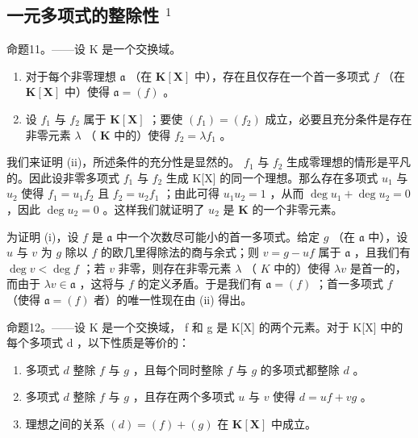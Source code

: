 \subsection{\texorpdfstring{一元多项式的整除性 \(^{1}\)}{一元多项式的整除性 [1]}}

命题11。——设 K 是一个交换域。

\begin{enumerate}
\def\labelenumi{(\roman{enumi})}
\item
  对于每个非零理想 \(\mathfrak{a}\) （在 \(\mathbf{K}[\mathbf{X}]\) 中），存在且仅存在一个首一多项式 \(f\) （在 \(\mathbf{K}[\mathbf{X}]\) 中）使得 \(\mathfrak{a} = (f)\) 。
\item
  设 \(f_{1}\) 与 \(f_{2}\) 属于 \(\mathbf{K}[\mathbf{X}]\) ；要使 \((f_{1}) = (f_{2})\) 成立，必要且充分条件是存在非零元素 \(\lambda\) （ \(\mathbf{K}\) 中的）使得 \(f_{2} = \lambda f_{1}\) 。
\end{enumerate}

我们来证明 (ii)，所述条件的充分性是显然的。 \(f_{1}\) 与 \(f_{2}\) 生成零理想的情形是平凡的。因此设非零多项式 \(f_{1}\) 与 \(f_{2}\) 生成 K{[}X{]} 的同一个理想。那么存在多项式 \(u_{1}\) 与 \(u_{2}\) 使得 \(f_{1}=u_{1}f_{2}\) 且 \(f_{2}=u_{2}f_{1}\) ；由此可得 \(u_{1}u_{2} = 1\) ，从而 \(\deg u_{1} + \deg u_{2} = 0\) ，因此 \(\deg u_{2} = 0\) 。这样我们就证明了 \(u_{2}\) 是 \(\mathbf{K}\) 的一个非零元素。

为证明 (i)，设 \(f\) 是 \(\mathfrak{a}\) 中一个次数尽可能小的首一多项式。给定 \(g\) （在 \(\mathfrak{a}\) 中），设 \(u\) 与 \(v\) 为 \(g\) 除以 \(f\) 的欧几里得除法的商与余式；则 \(v = g - uf\) 属于 \(\mathfrak{a}\) ，且我们有 \(\deg v < \deg f\) ；若 \(v\) 非零，则存在非零元素 \(\lambda\) （ \(K\) 中的）使得 \(\lambda v\) 是首一的，而由于 \(\lambda v \in \mathfrak{a}\) ，这将与 \(f\) 的定义矛盾。于是我们有 \(\mathfrak{a} = (f)\) ；首一多项式 \(f\) （使得 \(\mathfrak{a} = (f)\) 者）的唯一性现在由 (ii) 得出。

命题12。——设 K 是一个交换域， f 和 g 是 K{[}X{]} 的两个元素。对于 K{[}X{]} 中的每个多项式 d ，以下性质是等价的：

\begin{enumerate}
\def\labelenumi{(\roman{enumi})}
\item
  多项式 \(d\) 整除 \(f\) 与 \(g\) ，且每个同时整除 \(f\) 与 \(g\) 的多项式都整除 \(d\) 。
\item
  多项式 \(d\) 整除 \(f\) 与 \(g\) ，且存在两个多项式 \(u\) 与 \(v\) 使得 \(d = uf + vg\) 。
\item
  理想之间的关系 \((d) = (f) + (g)\) 在 \(\mathbf{K}[\mathbf{X}]\) 中成立。
\end{enumerate}

